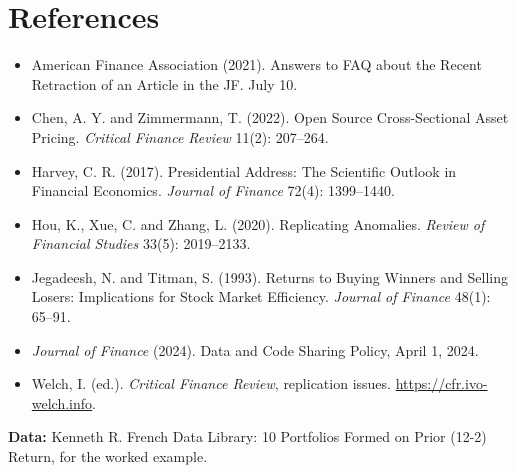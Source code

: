 \section*{References}

\begin{itemize}
  \item American Finance Association (2021). Answers to FAQ about the Recent Retraction of an Article in the JF. July 10.
  \item Chen, A. Y. and Zimmermann, T. (2022). Open Source Cross-Sectional Asset Pricing. \emph{Critical Finance Review} 11(2): 207--264.
  \item Harvey, C. R. (2017). Presidential Address: The Scientific Outlook in Financial Economics. \emph{Journal of Finance} 72(4): 1399--1440.
  \item Hou, K., Xue, C. and Zhang, L. (2020). Replicating Anomalies. \emph{Review of Financial Studies} 33(5): 2019--2133.
  \item Jegadeesh, N. and Titman, S. (1993). Returns to Buying Winners and Selling Losers: Implications for Stock Market Efficiency. \emph{Journal of Finance} 48(1): 65--91.
  \item \emph{Journal of Finance} (2024). Data and Code Sharing Policy, April 1, 2024.
  \item Welch, I. (ed.). \emph{Critical Finance Review}, replication issues. \url{https://cfr.ivo-welch.info}.
\end{itemize}

\textbf{Data:} Kenneth R. French Data Library: 10 Portfolios Formed on Prior (12-2) Return, for the worked example.
